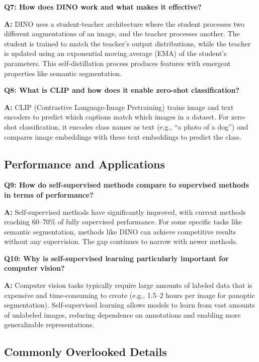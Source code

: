 \textbf{Q7: How does DINO work and what makes it effective?}

\textbf{A:} DINO uses a student-teacher architecture where the student processes two different augmentations of an image, and the teacher processes another. The student is trained to match the teacher's output distributions, while the teacher is updated using an exponential moving average (EMA) of the student's parameters. This self-distillation process produces features with emergent properties like semantic segmentation.

\textbf{Q8: What is CLIP and how does it enable zero-shot classification?}

\textbf{A:} CLIP (Contrastive Language-Image Pretraining) trains image and text encoders to predict which captions match which images in a dataset. For zero-shot classification, it encodes class names as text (e.g., ``a photo of a dog'') and compares image embeddings with these text embeddings to predict the class.

\subsection*{Performance and Applications}

\textbf{Q9: How do self-supervised methods compare to supervised methods in terms of performance?}

\textbf{A:} Self-supervised methods have significantly improved, with current methods reaching 60--70\% of fully supervised performance. For some specific tasks like semantic segmentation, methods like DINO can achieve competitive results without any supervision. The gap continues to narrow with newer methods.

\textbf{Q10: Why is self-supervised learning particularly important for computer vision?}

\textbf{A:} Computer vision tasks typically require large amounts of labeled data that is expensive and time-consuming to create (e.g., 1.5--2 hours per image for panoptic segmentation). Self-supervised learning allows models to learn from vast amounts of unlabeled images, reducing dependence on annotations and enabling more generalizable representations.

\subsection*{Commonly Overlooked Details}

